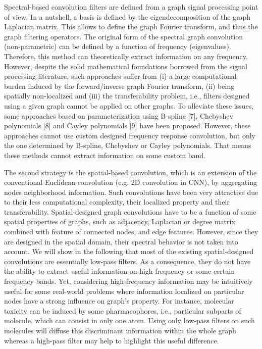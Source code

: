 \documentclass{article}
\begin{document}
Spectral-based convolution filters are defined from a graph signal processing point of view. In a nutshell, a basis is defined by the eigendecomposition of the graph Laplacian matrix. This allows to define the graph Fourier transform, and thus the graph filtering operators. The original form of the spectral graph convolution (non-parametric) can be defined by a function of frequency (eigenvalues). Therefore, this method can theoretically extract information on any frequency. However, despite the solid mathematical foundations borrowed from the signal processing literature, such approaches suffer from (i) a large computational burden induced by the forward/inverse graph Fourier transform, (ii) being spatially non-localized and (iii) the transferability problem, i.e., filters designed using a given graph cannot be applied on other graphs. To alleviate these issues, some approaches based on parameterization using B-spline [7], Chebyshev polynomials [8] and Cayley polynomials [9] have been proposed.
However, these approaches cannot use custom designed frequency response convolution, but only the one determined by B-spline, Chebyshev or Cayley polynomials. That means these methods cannot extract information on some custom band.

The second strategy is the spatial-based convolution, which is an extension of the conventional Euclidean convolution (e.g. 2D convolution in CNN), by aggregating nodes neighborhood information. Such convolutions have been very attractive due to their less computational complexity, their localized property and their transferability. Spatial-designed graph convolutions have to be a function of some spatial properties of graphs, such as adjacency, Laplacian or degree matrix combined with feature of connected nodes, and edge features. However, since they are designed in the spatial domain, their spectral behavior is not taken into account. We will show in the following that most of the existing spatial-designed convolutions are essentially low-pass filters. As a consequence, they do not have the ability to extract useful information on high frequency or some certain frequency bands. Yet, considering high-frequency information may be intuitively useful for some real-world problems where information localized on particular nodes have a strong influence on graph's property. For instance, molecular toxicity can be induced by some pharmacophores, i.e., particular subparts of molecule, which can consist in only one atom. Using only low-pass filters on such molecules will diffuse this discriminant information within the whole graph whereas a high-pass filter may help to highlight this useful difference.
\end{document}
